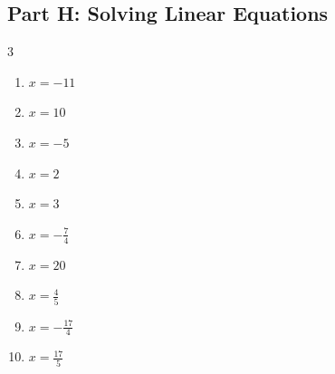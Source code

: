 \documentclass[11pt]{article}
\begin{document}
\subsection*{Part H: Solving Linear Equations}
\begin{multicols}{3}
\begin{enumerate}
  \item $x = -11$
  \item $x = 10$
  \item $x = -5$
  \item $x = 2$
  \item $x = 3$
  \item $x = - \frac{7}{4}$
  \item $x = 20$
  \item $x = \frac{4}{5}$
  \item $x = - \frac{17}{4}$
  \item $x = \frac{17}{5}$
\end{enumerate}
\end{multicols}
\end{document}
